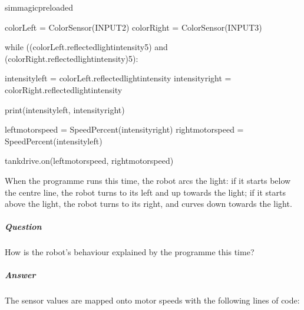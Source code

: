\documentclass[letterpaper,10pt,english]{sphinxmanual}
\begin{document}
{{
\begin{sphinxVerbatim}[commandchars=\\\{\}]
\llap{\color{nbsphinxin}[ ]:\,\hspace{\fboxrule}\hspace{\fboxsep}}\PYGZpc{}\PYGZpc{}sim\PYGZus{}magic\PYGZus{}preloaded

colorLeft = ColorSensor(INPUT\PYGZus{}2)
colorRight = ColorSensor(INPUT\PYGZus{}3)

while ((colorLeft.reflected\PYGZus{}light\PYGZus{}intensity\PYGZgt{}5)
       and (colorRight.reflected\PYGZus{}light\PYGZus{}intensity)\PYGZgt{}5):

    intensity\PYGZus{}left = colorLeft.reflected\PYGZus{}light\PYGZus{}intensity
    intensity\PYGZus{}right = colorRight.reflected\PYGZus{}light\PYGZus{}intensity

    print(intensity\PYGZus{}left, intensity\PYGZus{}right)

    left\PYGZus{}motor\PYGZus{}speed = SpeedPercent(intensity\PYGZus{}right)
    right\PYGZus{}motor\PYGZus{}speed = SpeedPercent(intensity\PYGZus{}left)

    tank\PYGZus{}drive.on(left\PYGZus{}motor\PYGZus{}speed, right\PYGZus{}motor\PYGZus{}speed)
\end{sphinxVerbatim}
}

When the programme runs this time, the robot arcs  the light: if it starts below the centre line, the robot turns to its left and up towards the light; if it starts above the light, the robot turns to its right, and curves down towards the light.


\subparagraph{Question}
\label{\detokenize{content/03_Robot_Lab/Section_00_03:Question}}
How is the robot’s behaviour explained by the programme this time?



\subparagraph{Answer}
\label{\detokenize{content/03_Robot_Lab/Section_00_03:Answer}}

The sensor values are mapped onto motor speeds with the following lines of code:

\begin{sphinxVerbatim}[commandchars=\\\{\}]
  
  


\end{sphinxVerbatim}}
\end{document}
